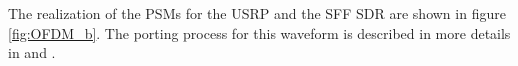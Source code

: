 The realization of the \acp{PSM} for the USRP and the SFF SDR are shown in figure \ref{fig:OFDM_b}. The porting process for this waveform is described in more details in \cite{nagel_frequenz} and \cite{pwd}.




%
%
%
